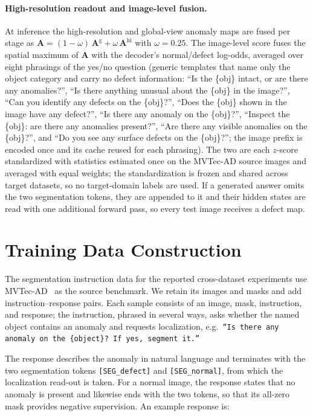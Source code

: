 \paragraph{High-resolution readout and image-level fusion.}
At inference the high-resolution and global-view anomaly maps are fused per stage as $\mathbf{A}=(1-\omega)\,\mathbf{A}^{\mathrm{g}}+\omega\,\mathbf{A}^{\mathrm{hi}}$ with $\omega=0.25$. The image-level score fuses the spatial maximum of $\mathbf{A}$ with the decoder's normal/defect log-odds, averaged over eight phrasings of the yes/no question (generic templates that name only the object category and carry no defect information: ``Is the \{obj\} intact, or are there any anomalies?'', ``Is there anything unusual about the \{obj\} in the image?'', ``Can you identify any defects on the \{obj\}?'', ``Does the \{obj\} shown in the image have any defect?'', ``Is there any anomaly on the \{obj\}?'', ``Inspect the \{obj\}: are there any anomalies present?'', ``Are there any visible anomalies on the \{obj\}?'', and ``Do you see any surface defects on the \{obj\}?''; the image prefix is encoded once and its cache reused for each phrasing). The two are each $z$-score standardized with statistics estimated once on the MVTec-AD source images and averaged with equal weights; the standardization is frozen and shared across target datasets, so no target-domain labels are used. If a generated answer omits the two segmentation tokens, they are appended to it and their hidden states are read with one additional forward pass, so every test image receives a defect map.

\section{Training Data Construction}
\label{app:data}
The segmentation instruction data for the reported cross-dataset experiments use MVTec-AD~\cite{Bergmann_2019_CVPR} as the source benchmark. We retain its images and masks and add instruction--response pairs. Each sample consists of an image, mask, instruction, and response; the instruction, phrased in several ways, asks whether the named object contains an anomaly and requests localization, e.g.\ \texttt{``Is there any anomaly on the \{object\}? If yes, segment it.''}

The response describes the anomaly in natural language and terminates with the two segmentation tokens \texttt{[SEG\_defect]} and \texttt{[SEG\_normal]}, from which the localization read-out is taken. For a normal image, the response states that no anomaly is present and likewise ends with the two tokens, so that its all-zero mask provides negative supervision. An example response is:

